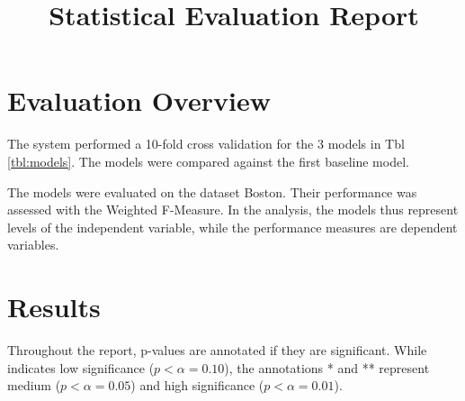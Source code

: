 \documentclass[a4paper,12pt]{article}
\title{Statistical Evaluation Report}
\date{\vspace{-10ex}}
\begin{document}
\maketitle
\section{Evaluation Overview}The system performed a 10-fold cross validation for the 3 models in Tbl \ref{tbl:models}. The models were compared against the first baseline model. 

\begin{table}[h!]
\centering
{}\caption{Evaluated models with classifier algorithm and feature sets}
\label{tbl:models}
\end{table}

The models were evaluated on the dataset Boston. Their performance was assessed with the Weighted F-Measure. In the analysis, the models thus represent levels of the independent variable, while the performance measures are dependent variables.
\FloatBarrier
\section{Results}
Throughout the report, p-values are annotated if they are significant. While {\footnotesize *} indicates low significance ($p<\alpha=0.10$), the annotations {\footnotesize **} and {\footnotesize ***} represent medium ($p<\alpha=0.05$) and high significance ($p<\alpha=0.01$).\FloatBarrier
\end{document}
